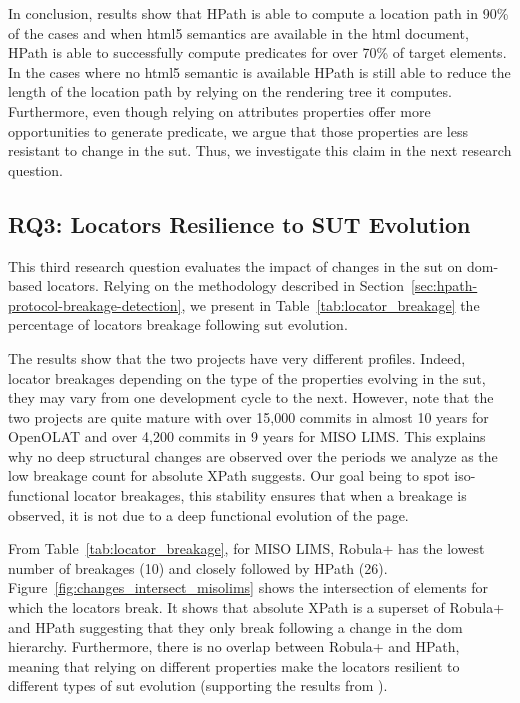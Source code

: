 In conclusion, results show that HPath is able to compute a location path in 90\% of the cases and when \gls{html}5 semantics are available in the \gls{html} document, HPath is able to successfully compute predicates for over 70\% of target elements. In the cases where no \gls{html}5 semantic is available HPath is still able to reduce the length of the location path by relying on the rendering tree it computes. Furthermore, even though relying on attributes properties offer more opportunities to generate predicate, we argue that those properties are less resistant to change in the \gls{sut}. Thus, we investigate this claim in the next research question.

\subsection{RQ3: Locators Resilience to SUT Evolution}
\label{sec:locator_evolution_analysis_results}

This third research question evaluates the impact of changes in the \gls{sut} on \gls{dom}-based locators. Relying on the methodology described in Section~\ref{sec:hpath-protocol-breakage-detection}, we present in Table~\ref{tab:locator_breakage} the percentage of locators breakage following \gls{sut} evolution. 

The results show that the two projects have very different profiles. Indeed, locator breakages depending on the type of the properties evolving in the \gls{sut}, they may vary from one development cycle to the next. However, note that the two projects are quite mature with over 15,000 commits in almost 10 years for OpenOLAT and over 4,200 commits in 9 years for MISO LIMS. This explains why no deep structural changes are observed over the periods we analyze as the low breakage count for absolute XPath suggests. Our goal being to spot iso-functional locator breakages, this stability ensures that when a breakage is observed, it is not due to a deep functional evolution of the page.

From Table~\ref{tab:locator_breakage}, for MISO LIMS, Robula+ has the lowest number of breakages (10) and closely followed by HPath (26). Figure~\ref{fig:changes_intersect_misolims} shows the intersection of elements for which the locators break. It shows that absolute XPath is a superset of Robula+ and HPath suggesting that they only break following a change in the \gls{dom} hierarchy. Furthermore, there is no overlap between Robula+ and HPath, meaning that relying on different properties make the locators resilient to different types of \gls{sut} evolution (supporting the results from \textcite{Leotta2015}).

